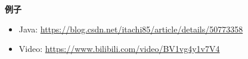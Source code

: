 \noindent\textbf{例子}

\begin{itemize}
    \item Java: \url{https://blog.csdn.net/itachi85/article/details/50773358}
    \item Video: \url{https://www.bilibili.com/video/BV1vg4y1v7V4}
\end{itemize}



\newpage